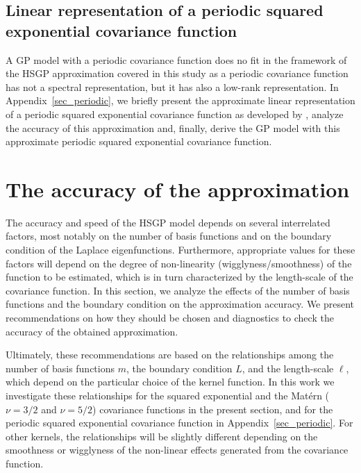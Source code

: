 \subsection{Linear representation of a periodic squared exponential covariance function} \label{sec_method_periodic}

A GP model with a periodic covariance function does no fit in the framework of the HSGP approximation covered in this study as a periodic covariance function has not a spectral representation, but it has also a low-rank representation. In Appendix~\ref{sec_periodic}, we briefly present the approximate linear representation of a periodic squared exponential covariance function as developed by \citet{solin2014explicit}, analyze the accuracy of this approximation and, finally, derive the GP model with this approximate periodic squared exponential covariance function.

\section{The accuracy of the approximation}\label{sec_accuracy}

The accuracy and speed of the HSGP model depends on several interrelated factors, most notably on the number of basis functions and on the boundary condition of the Laplace eigenfunctions. Furthermore, appropriate values for these factors will depend on the degree of non-linearity (wigglyness/smoothness) of the function to be estimated, which is in turn characterized by the length-scale of the covariance function. In this section, we analyze the effects of the number of basis functions and the boundary condition on the approximation accuracy. We present recommendations on how they should be chosen and diagnostics to check the accuracy of the obtained approximation. 

Ultimately, these recommendations are based on the relationships among the number of basis functions $m$, the boundary condition $L$, and the length-scale $\ell$, which depend on the particular choice of the kernel function. In this work we investigate these relationships for the squared exponential and the Mat{\'e}rn ($\nu=3/2$ and $\nu=5/2$) covariance functions in the present section, and for the periodic squared exponential covariance function in Appendix~\ref{sec_periodic}. For other kernels, the relationships will be slightly different depending on the smoothness or wigglyness of the non-linear effects generated from the covariance function.


